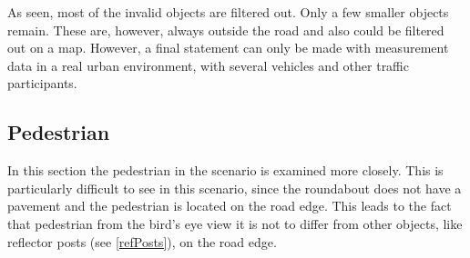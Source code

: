 \documentclass[11pt,oneside,openright]{mpreport}
\begin{document}
As seen, most of the invalid objects are filtered out. Only a few smaller objects remain.
These are, however, always outside the road and also could be filtered out on a map.
However, a final statement can only be made with measurement data in a real urban environment, with several vehicles and other traffic participants.

\subsection{Pedestrian}
In this section the pedestrian in the scenario is examined more closely. This is particularly difficult to see in this scenario, 
since the roundabout does not have a pavement and the pedestrian is located on the road edge.
This leads to the fact that pedestrian from the bird's eye view it is not to differ from other objects, like reflector posts (see \cref{refPosts}), on the road edge.
\end{document}
